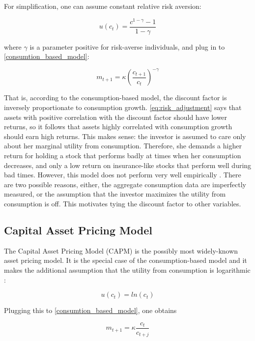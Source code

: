 		 	For simplification, one can assume constant relative risk aversion:
		 	
		 	\begin{equation}
		 		u(c_t) = \frac{c^{1-\gamma}-1}{1-\gamma}
		 	\end{equation}
		 	
		 	where $\gamma$ is a parameter positive for risk-averse individuals, and plug in to \ref{consumtion_based_model}: 
		 	
		 	\begin{equation}
		 		m_{t+1} = \kappa \left(\frac{c_{t+1}}{c_t}\right)^{-\gamma}
		 	\end{equation}
		 	
		 	 That is, according to the consumption-based model, the discount factor is inversely proportionate to consumption growth. \ref{eq:risk_adjustment} says that assets with positive correlation with the discount factor should have lower returns, so it follows that assets highly correlated with consumption growth should earn high returns. This makes sense: the investor is assumed to care only about her marginal utility from consumption. Therefore, she demands a higher return for holding a stock that performs badly at times when her consumption decreases, and only a low return on insurance-like stocks that perform well during bad times. However, this model does not perform very well empirically \cite{cochrane1996cross}. There are two possible reasons, either, the aggregate consumption data are imperfectly measured, or the assumption that the investor maximizes the utility from consumption is off. This motivates tying the discount factor to other variables.
	 	
	 	\subsection{Capital Asset Pricing Model}
	 	
	 		The Capital Asset Pricing Model (CAPM) is the possibly most widely-known asset pricing model. It is the special case of the consumption-based model and it makes the additional assumption that the utility from consumption is logarithmic \citep{rubinstein1976valuation}:
	 		
	 		\begin{equation}
	 			u(c_t) = ln(c_t)
	 		\end{equation}
	 		
	 		Plugging this to \ref{consumtion_based_model}, one obtains 
	 		
	 		\begin{equation}
	 			m_{t+1} = \kappa \frac{c_t}{c_{t+j}}
	 		\end{equation}
	 		
